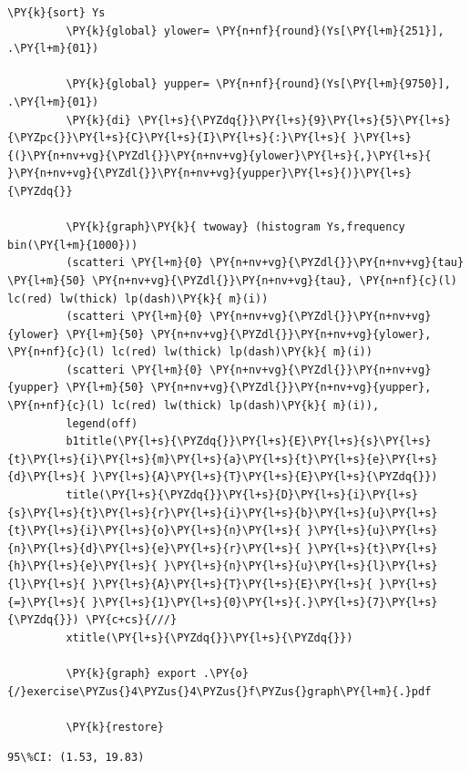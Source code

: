 \documentclass[11pt,notitlepage]{article}\usepackage[]{graphicx}\usepackage[]{color}
\makeatletter
\newenvironment{kframe}{%
 \def\at@end@of@kframe{}%
 \ifinner\ifhmode%
  \def\at@end@of@kframe{\end{minipage}}%
  \begin{minipage}{\columnwidth}%
 \fi\fi%
 \def\FrameCommand##1{\hskip\@totalleftmargin \hskip-\fboxsep
 \colorbox{shadecolor}{##1}\hskip-\fboxsep
     \hskip-\linewidth \hskip-\@totalleftmargin \hskip\columnwidth}%
 \MakeFramed {\advance\hsize-\width
   \@totalleftmargin\z@ \linewidth\hsize
   \@setminipage}}%
 {\par\unskip\endMakeFramed%
 \at@end@of@kframe}
\newenvironment{knitrout}{}{} %
\makeatother
\begin{document}
\begin{enumerate}[a)]
\begin{knitrout}
\begin{kframe}
\begin{Verbatim}[commandchars=\\\{\}]
         \PY{k}{sort} Ys
         \PY{k}{global} ylower= \PY{n+nf}{round}(Ys[\PY{l+m}{251}], .\PY{l+m}{01})
         
         \PY{k}{global} yupper= \PY{n+nf}{round}(Ys[\PY{l+m}{9750}], .\PY{l+m}{01})
         \PY{k}{di} \PY{l+s}{\PYZdq{}}\PY{l+s}{9}\PY{l+s}{5}\PY{l+s}{\PYZpc{}}\PY{l+s}{C}\PY{l+s}{I}\PY{l+s}{:}\PY{l+s}{ }\PY{l+s}{(}\PY{n+nv+vg}{\PYZdl{}}\PY{n+nv+vg}{ylower}\PY{l+s}{,}\PY{l+s}{ }\PY{n+nv+vg}{\PYZdl{}}\PY{n+nv+vg}{yupper}\PY{l+s}{)}\PY{l+s}{\PYZdq{}} 
         
         \PY{k}{graph}\PY{k}{ twoway} (histogram Ys,frequency bin(\PY{l+m}{1000})) 
         (scatteri \PY{l+m}{0} \PY{n+nv+vg}{\PYZdl{}}\PY{n+nv+vg}{tau} \PY{l+m}{50} \PY{n+nv+vg}{\PYZdl{}}\PY{n+nv+vg}{tau}, \PY{n+nf}{c}(l) lc(red) lw(thick) lp(dash)\PY{k}{ m}(i)) 
         (scatteri \PY{l+m}{0} \PY{n+nv+vg}{\PYZdl{}}\PY{n+nv+vg}{ylower} \PY{l+m}{50} \PY{n+nv+vg}{\PYZdl{}}\PY{n+nv+vg}{ylower}, \PY{n+nf}{c}(l) lc(red) lw(thick) lp(dash)\PY{k}{ m}(i)) 
         (scatteri \PY{l+m}{0} \PY{n+nv+vg}{\PYZdl{}}\PY{n+nv+vg}{yupper} \PY{l+m}{50} \PY{n+nv+vg}{\PYZdl{}}\PY{n+nv+vg}{yupper}, \PY{n+nf}{c}(l) lc(red) lw(thick) lp(dash)\PY{k}{ m}(i)),
         legend(off) 
         b1title(\PY{l+s}{\PYZdq{}}\PY{l+s}{E}\PY{l+s}{s}\PY{l+s}{t}\PY{l+s}{i}\PY{l+s}{m}\PY{l+s}{a}\PY{l+s}{t}\PY{l+s}{e}\PY{l+s}{d}\PY{l+s}{ }\PY{l+s}{A}\PY{l+s}{T}\PY{l+s}{E}\PY{l+s}{\PYZdq{}}) 
         title(\PY{l+s}{\PYZdq{}}\PY{l+s}{D}\PY{l+s}{i}\PY{l+s}{s}\PY{l+s}{t}\PY{l+s}{r}\PY{l+s}{i}\PY{l+s}{b}\PY{l+s}{u}\PY{l+s}{t}\PY{l+s}{i}\PY{l+s}{o}\PY{l+s}{n}\PY{l+s}{ }\PY{l+s}{u}\PY{l+s}{n}\PY{l+s}{d}\PY{l+s}{e}\PY{l+s}{r}\PY{l+s}{ }\PY{l+s}{t}\PY{l+s}{h}\PY{l+s}{e}\PY{l+s}{ }\PY{l+s}{n}\PY{l+s}{u}\PY{l+s}{l}\PY{l+s}{l}\PY{l+s}{ }\PY{l+s}{A}\PY{l+s}{T}\PY{l+s}{E}\PY{l+s}{ }\PY{l+s}{=}\PY{l+s}{ }\PY{l+s}{1}\PY{l+s}{0}\PY{l+s}{.}\PY{l+s}{7}\PY{l+s}{\PYZdq{}}) \PY{c+cs}{///}
         xtitle(\PY{l+s}{\PYZdq{}}\PY{l+s}{\PYZdq{}})
         
         \PY{k}{graph} export .\PY{o}{/}exercise\PYZus{}4\PYZus{}4\PYZus{}f\PYZus{}graph\PY{l+m}{.}pdf
         
         \PY{k}{restore}
\end{Verbatim}

    \begin{Verbatim}[commandchars=\\\{\}]
95\%CI: (1.53, 19.83)
    \end{Verbatim}
\end{kframe}


\end{knitrout}
\end{enumerate}
\end{document}
